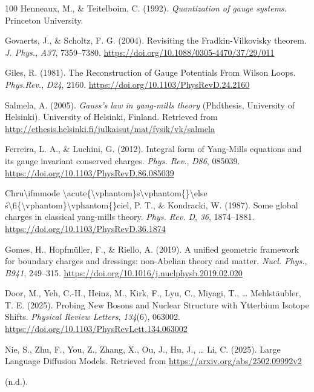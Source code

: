 \documentclass[11pt]{book}
\begin{document}
\begin{thebibliography}{100}
 Henneaux, M., \& Teitelboim, C. (1992). \emph{Quantization of gauge
systems}. Princeton University.

 Govaerts, J., \& Scholtz, F. G. (2004). Revisiting the
Fradkin-Vilkovisky theorem. \emph{J. Phys.}, \emph{A37}, 7359--7380.
\url{https://doi.org/10.1088/0305-4470/37/29/011}

 Giles, R. (1981). The Reconstruction of Gauge Potentials From Wilson
Loops. \emph{Phys.Rev.}, \emph{D24}, 2160.
\url{https://doi.org/10.1103/PhysRevD.24.2160}

 Salmela, A. (2005). \emph{Gauss's law in yang-mills theory} (Phdthesis,
University of Helsinki). University of Helsinki, Finland. Retrieved from
\url{http://ethesis.helsinki.fi/julkaisut/mat/fysik/vk/salmela}

 Ferreira, L. A., \& Luchini, G. (2012). Integral form of Yang-Mills
equations and its gauge invariant conserved charges. \emph{Phys. Rev.},
\emph{D86}, 085039. \url{https://doi.org/10.1103/PhysRevD.86.085039}

 Chru\textbackslash ifmmode
\textbackslash acute\{\textbackslash vphantom\}s\textbackslash vphantom\{\}\textbackslash else
ś\textbackslash fi\{\textbackslash vphantom\}\textbackslash vphantom\{\}ciel,
P. T., \& Kondracki, W. (1987). Some global charges in classical
yang-mills theory. \emph{Phys. Rev. D}, \emph{36}, 1874--1881.
\url{https://doi.org/10.1103/PhysRevD.36.1874}

 Gomes, H., Hopfmüller, F., \& Riello, A. (2019). A unified geometric
framework for boundary charges and dressings: non-Abelian theory and
matter. \emph{Nucl. Phys.}, \emph{B941}, 249--315.
\url{https://doi.org/10.1016/j.nuclphysb.2019.02.020}

 Door, M., Yeh, C.-H., Heinz, M., Kirk, F., Lyu, C., Miyagi, T., \ldots{}
Mehlstäubler, T. E. (2025). Probing New Bosons and Nuclear Structure
with Ytterbium Isotope Shifts. \emph{Physical Review Letters},
\emph{134}(6), 063002.
\url{https://doi.org/10.1103/PhysRevLett.134.063002}

 Nie, S., Zhu, F., You, Z., Zhang, X., Ou, J., Hu, J., \ldots{} Li, C.
(2025). Large Language Diffusion Models. Retrieved from
\url{https://arxiv.org/abs/2502.09992v2}

 (n.d.).


\end{thebibliography}
\end{document}
